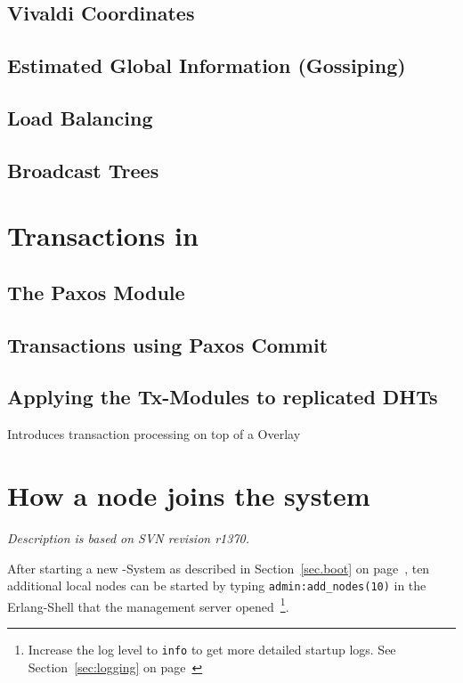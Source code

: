 \documentclass[a4paper]{scrreprt}
\newcommand{\sieheref}[1]{\ref{#1} on page~\pageref{#1}}
\newcommand{\code}[1]{\lstinline[basicstyle=\ttfamily]!#1!}
\newcommand{\svnrev}[1]
{\hfill\emph{Description is based on SVN revision #1.}\medskip}
\begin{document}
\section{Vivaldi Coordinates}

\section{Estimated Global Information (Gossiping)}

\section{Load Balancing}

\section{Broadcast Trees}



\chapter{Transactions in \scalaris{}}
\label{chapter.transactions}

\section{The Paxos Module}

\section{Transactions using Paxos Commit}

\section{Applying the Tx-Modules to replicated DHTs}

Introduces transaction processing on top of a Overlay



\chapter{How a node joins the system}
\label{chapter.join}
\svnrev{r1370}

After starting a new \scalaris{}-System as described in
Section~\sieheref{sec.boot}, ten additional local nodes can be started
by typing \code{admin:add_nodes(10)} in the Erlang-Shell that the management
server opened~\footnote{Increase the log level to {\tt info} to get
more detailed startup logs. See Section~\sieheref{sec:logging}}.
\end{document}
